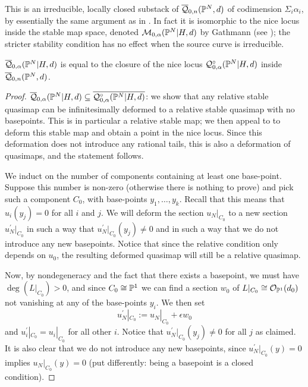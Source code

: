 This is an irreducible, locally closed substack of $\overline{\mathcal Q}_{0,n}(\mathbb P^N,d)$ of codimension $\Sigma_i \alpha_i$, by essentially the same argument as in \cite[Lemma 1.8]{Ga}. In fact it is isomorphic to the nice locus inside the stable map space, denoted $\mathcal M_{0,\alpha}(\mathbb P^N|H,d)$ by Gathmann (see \cite[Def. 1.6]{Ga}); the stricter stability condition has no effect when the source curve is irreducible.

\begin{lem} \label{lem:closure}
$\overline{\mathcal Q}_{0,\alpha}(\mathbb P^N|H,d)$ is equal to the closure of the nice locus $\mathcal{Q}^{\circ}_{0,\alpha}(\mathbb P^N|H,d)$ inside $\overline{\mathcal Q}_{0,n}(\mathbb P^N,d)$. 
\end{lem}
\begin{proof}
$\overline{\mathcal Q}_{0,\alpha}(\mathbb P^N|H,d)\subseteq\overline{\mathcal{Q}^{\circ}_{0,\alpha}(\mathbb P^N|H,d)}$: we show that any relative stable quasimap can be infinitesimally deformed to a relative stable quasimap with no basepoints. This is in particular a relative stable map; we then appeal to \cite[Prop. 1.14]{Ga} to deform this stable map and obtain a point in the nice locus. Since this deformation does not introduce any rational tails, this is also a deformation of quasimaps, and the statement follows.

We induct on the number of components containing at least one base-point. Suppose this number is non-zero (otherwise there is nothing to prove) and pick such a component $C_0$, with base-points $y_1 ,\ldots, y_k$. Recall that this means that $u_i(y_j)=0$ for all $i$ and $j$. We will deform the section $u_N|_{C_0}$ to a new section $u_N^\prime|_{C_0}$ in such a way that $u_N^\prime|_{C_0}(y_j) \neq 0$ and in such a way that we do not introduce any new basepoints. Notice that since the relative condition only depends on $u_0$, the resulting deformed quasimap will still be a relative quasimap.

Now, by nondegeneracy and the fact that there exists a basepoint, we must have $\deg(L|_{C_0})>0$, and since $C_0 \cong \mathbb P^1$ we can find a section $w_0$ of $L|_{C_0} \cong \mathcal{O}_{\mathbb P^1}(d_0)$ not vanishing at any of the base-points $y_i$.
We then set
\begin{equation*} u_N^\prime|_{C_0} := u_N|_{C_0} + \epsilon w_0 \end{equation*}
and $u_i^\prime|_{C_0} = u_i|_{C_0}$ for all other $i$. Notice that $u_N^\prime|_{C_0}(y_j) \neq 0$ for all $j$ as claimed. It is also clear that we do not introduce any new basepoints, since $u_N^\prime|_{C_0}(y) = 0$ implies $u_N|_{C_0}(y)=0$ (put differently: being a basepoint is a closed condition).


\end{proof}
